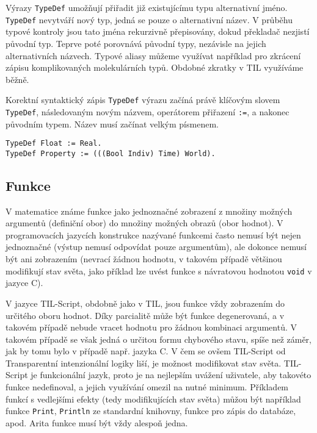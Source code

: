 Výrazy \lstinline{TypeDef} umožňují přiřadit již existujícímu typu alternativní jméno.
\lstinline{TypeDef} nevytváří nový typ, jedná se pouze o alternativní název. V průběhu typové
kontroly jsou tato jména rekurzivně přepisovány, dokud překladač nezjistí původní typ. Teprve poté
porovnává původní typy, nezávisle na jejich alternativních názvech. Typové aliasy můžeme využívat
například pro zkrácení zápisu komplikovaných molekulárních typů. Obdobné zkratky v TIL využíváme
běžně.

Korektní syntaktický zápis \lstinline{TypeDef} výrazu začíná právě klíčovým slovem
\lstinline{TypeDef}, následovaným novým názvem, operátorem přiřazení \lstinline{:=}, a nakonec
původním typem. Název musí začínat velkým písmenem.

\begin{lstlisting}[caption={Výraz TypeDef}]
TypeDef Float := Real.
TypeDef Property := (((Bool Indiv) Time) World).
\end{lstlisting}

\subsection{Funkce}

V matematice známe funkce jako jednoznačné zobrazení z množiny možných argumentů (definiční obor)
do množiny možných obrazů (obor hodnot). V programovacích jazycích konstrukce nazývané funkcemi
často nemusí být nejen jednoznačné (výstup nemusí odpovídat pouze argumentům), ale dokonce nemusí
být ani zobrazením (nevrací žádnou hodnotu, v takovém případě většinou modifikují stav světa,
jako příklad lze uvést funkce s návratovou hodnotou \lstinline{void} v jazyce C).

V jazyce TIL-Script, obdobně jako v TIL, jsou funkce vždy zobrazením do určitého oboru hodnot. Díky
parcialitě může být funkce degenerovaná, a v takovém případě nebude vracet hodnotu pro žádnou
kombinaci argumentů. V takovém případě se však jedná o určitou formu chybového stavu, spíše než
záměr, jak by tomu bylo v případě např. jazyka C. V čem se ovšem TIL-Script od Transparentní
intenzionální logiky liší, je možnost modifikovat stav světa. TIL-Script je funkcionální jazyk,
proto je na nejlepším uvážení uživatele, aby takovéto funkce nedefinoval, a jejich využívání omezil
na nutné minimum. Příkladem funkcí s vedlejšími efekty (tedy modifikujících stav světa) můžou
být například funkce \lstinline{Print}, \lstinline{Println} ze standardní knihovny, funkce
pro zápis do databáze, apod. Arita funkce musí být vždy alespoň jedna.

